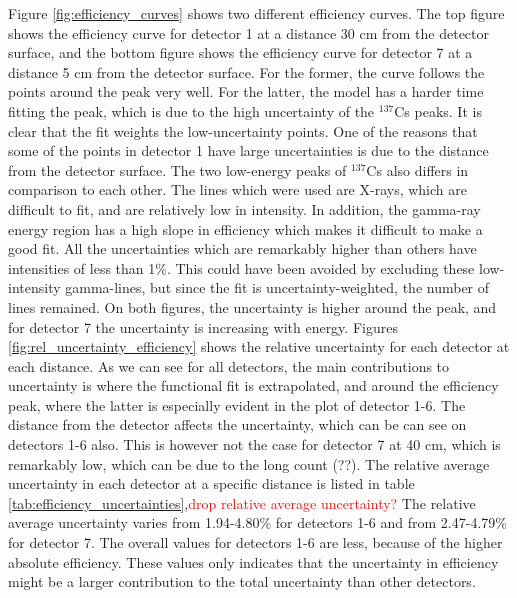 Figure \ref{fig:efficiency_curves} shows two different efficiency curves. The top figure shows the efficiency curve for detector 1 at a distance 30 cm from the detector surface, and the bottom figure shows the efficiency curve for detector 7 at a distance 5 cm from the detector surface. For the former, the curve follows the points around the peak very well. For the latter, the model has a harder time fitting the peak, which is due to the high uncertainty of the $^{137}$Cs peaks. It is clear that the fit weights the low-uncertainty points. One of the reasons that some of the points in detector 1 have large uncertainties is due to the distance from the detector surface.  The two low-energy peaks of $^{137}$Cs also differs in comparison to each other. The lines which were used are X-rays, which are difficult to fit, and are relatively low in intensity. In addition, the gamma-ray energy region has a high slope in efficiency which makes it difficult to make a good fit.  All the uncertainties which are remarkably higher than others have intensities of less than 1\%. This could have been avoided by excluding these low-intensity gamma-lines, but since the fit is uncertainty-weighted, the number of lines remained. On both figures, the uncertainty is higher around the peak, and for detector 7 the uncertainty is increasing with energy. Figures \ref{fig:rel_uncertainty_efficiency} shows the relative uncertainty for each detector at each distance. As we can see for all detectors, the main contributions to uncertainty is where the functional fit is extrapolated, and around the efficiency peak, where the latter is especially evident in the plot of detector 1-6. The distance from the detector affects the uncertainty, which can be can see on detectors 1-6 also. This is however not the case for detector 7 at 40 cm, which is remarkably low, which can be due to the long count (??). The relative average uncertainty in each detector at a specific distance is listed in table \ref{tab:efficiency_uncertainties},\textcolor{red}{drop relative average uncertainty?}  The relative average uncertainty varies from 1.94-4.80\% for detectors 1-6 and from 2.47-4.79\% for detector 7. The overall values for detectors 1-6 are less, because of the higher absolute efficiency. These values only indicates that the uncertainty in efficiency might be a larger contribution to the total uncertainty than other detectors. \\


